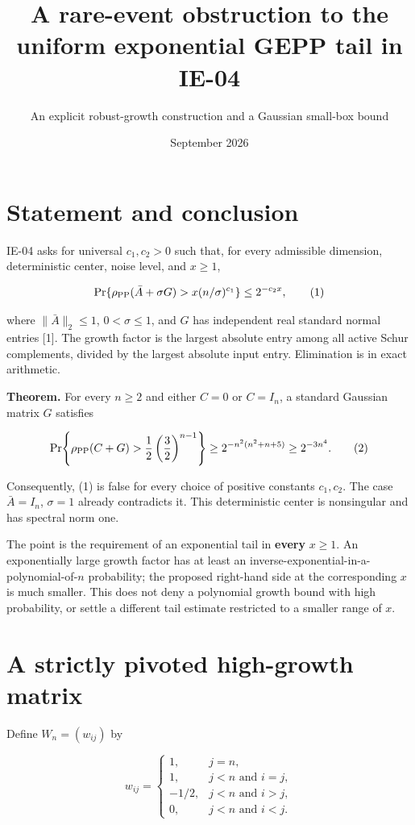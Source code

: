 \documentclass[
  11pt,
  letterpaper,
]{article}
\title{A rare-event obstruction to the uniform exponential GEPP tail in
IE-04}
\subtitle{An explicit robust-growth construction and a Gaussian
small-box bound}
\author{}
\date{September 2026}
\begin{document}
\maketitle

\section{Statement and conclusion}\label{statement-and-conclusion}

IE-04 asks for universal \(c_1,c_2>0\) such that, for every admissible
dimension, deterministic center, noise level, and \(x\geq1\),

\[
\Pr\{\rho_{\rm PP}(\bar A+\sigma G)>x(n/\sigma)^{c_1}\}
\leq 2^{-c_2x},
\tag{1}
\]

where \(\|\bar A\|_2\leq1\), \(0<\sigma\leq1\), and \(G\) has
independent real standard normal entries {[}1{]}. The growth factor is
the largest absolute entry among all active Schur complements, divided
by the largest absolute input entry. Elimination is in exact arithmetic.

\textbf{Theorem.} For every \(n\geq2\) and either \(C=0\) or \(C=I_n\),
a standard Gaussian matrix \(G\) satisfies

\[
\Pr\!\left\{\rho_{\rm PP}(C+G)>
\frac12\left(\frac32\right)^{n-1}\right\}
\geq 2^{-n^2(n^2+n+5)}
\geq 2^{-3n^4}.
\tag{2}
\]

Consequently, (1) is false for every choice of positive constants
\(c_1,c_2\). The case \(\bar A=I_n\), \(\sigma=1\) already contradicts
it. This deterministic center is nonsingular and has spectral norm one.

The point is the requirement of an exponential tail in \textbf{every}
\(x\geq1\). An exponentially large growth factor has at least an
inverse-exponential-in-a-polynomial-of-\(n\) probability; the proposed
right-hand side at the corresponding \(x\) is much smaller. This does
not deny a polynomial growth bound with high probability, or settle a
different tail estimate restricted to a smaller range of \(x\).

\section{A strictly pivoted high-growth
matrix}\label{a-strictly-pivoted-high-growth-matrix}

Define \(W_n=(w_{ij})\) by

\[
w_{ij}=\begin{cases}
1,&j=n,\\
1,&j<n\text{ and }i=j,\\
-1/2,&j<n\text{ and }i>j,\\
0,&j<n\text{ and }i<j.
\end{cases}
\tag{3}
\]
\end{document}
